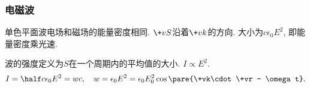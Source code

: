 \documentclass[hidelinks]{ctexart}
\begin{document}

\subsubsection{电磁波} %
\label{ssub:电磁波}

\begin{ex}
    单色平面波电场和磁场的能量密度相同. $\+vS$沿着$\+vk$的方向. 大小为$c\epsilon_0E^2$, 即能量密度乘光速.
\end{ex}
波的强度定义为$S$在一个周期内的平均值的大小. $I \propto E^2$.
\[ I = \half c\epsilon_0 E^2 = wc,\quad w = \epsilon_0 E^2 = \epsilon_0 E_0^2 \cos\pare{\+vk\cdot\+vr - \omega t}. \]



\end{document}
